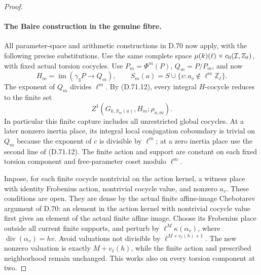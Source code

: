 \begin{proof}
\paragraph{The Baire construction in the genuine fibre.}
All parameter-space and arithmetic
constructions in D.70 now apply,
with the following precise
substitutions. Use the same complete
space
\(\mu(k)(\ell)\times c_0({\cal I},\mathbb Z_\ell)\),
with fixed actual torsion cocycles.
Use \(P_m=\Phi^m(P)\), \(Q_m=P/P_m\),
and now
\[
 H_m=\operatorname{im}(\gamma_3P\to Q_m),\qquad
 S_m(a)=S\cup\{v:a_v\notin\ell^m\mathbb Z_\ell\}.
                                                        \tag{D.71.13}
\]
The exponent of \(Q_m\) divides
\(\ell^m\). By (D.71.12), every
integral \(H\)-cocycle reduces to
the finite set
\[
                 Z^1(G_{k,S_m(a)},H_m;\rho_{a,m}).
                                                        \tag{D.71.14}
\]
In particular this finite capture
includes all unrestricted global
cocycles. At a later nonzero
inertia place, its integral local
conjugation coboundary is trivial
on \(Q_m\) because the exponent
of \(c\) is divisible by
\(\ell^m\); at a zero inertia
place use the second line of
(D.71.12). The finite action
and support are constant on
each fixed torsion component
and free-parameter coset
modulo \(\ell^m\).

Impose, for each finite cocycle
nontrivial on the action kernel,
a witness place with identity
Frobenius action, nontrivial
cocycle value, and nonzero
\(a_v\). These conditions are
open. They are dense by the
actual finite affine-image
Chebotarev argument of D.70:
an element in the action kernel
with nontrivial cocycle value
first gives an element of the
actual finite affine image.
Choose its Frobenius place
outside all current finite
supports, and perturb by
\(\ell^M\kappa(\alpha_v)\),
where \(\operatorname{div}(\alpha_v)=hv\).
Avoid valuations not divisible
by \(\ell^{M+v_\ell(h)+1}\).
The new nonzero valuation is
exactly \(M+v_\ell(h)\), while
the finite action and prescribed
neighborhood remain unchanged.
This works also on every torsion
component at two.


\end{proof}
